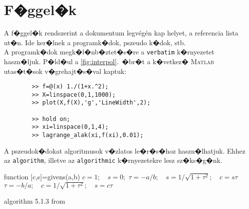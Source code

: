\documentclass[oneside,11pt,a4paper]{article}
\begin{document}
\newpage
\appendix
\thesection
\section{F�ggel�k}	
	A f�ggel�k rendszerint a dokumentum legvégén kap helyet, a referencia lista ut�n. Ide ker�lnek a programk�dok, pszeudo k�dok, stb.\\
	A programk�dok megk�l�nb�ztet�s�re a \texttt{verbatim} k�rnyezetet haszn�ljuk. P�ld�ul a \ref{fig:interpol}.~�br�t a k�vetkez� \textsc{Matlab} utas�t�sok v�grehajt�s�val kaptuk:
	\begin{verbatim}
		>> f=@(x) 1./(1+x.^2);
		>> X=linspace(0,1,1000);
		>> plot(X,f(X),'g','LineWidth',2);

		>> hold on;		
		>> xi=linspace(0,1,4);
		>> lagrange_alak(xi,f(xi),0.01);
	\end{verbatim}
	A pszeudok�dokat algoritmusok v�zlatos le�r�s�hoz haszn�lhatjuk. Ehhez az \texttt{algorithm}, illetve az \texttt{algorithmic} k�rnyezetekre lesz sz�ks�g�nk.
\begin{algorithm}[htp] 
\begin{algorithmic}
\STATE function [c,s]=givens(a,b)
        \STATE $c=1;\quad s=0;$
\ELSE
                \STATE $\tau=-a/b;\quad s=1/\sqrt{1+\tau^2};\quad c=s\tau$
        \ELSE
                \STATE $\tau=-b/a;\quad c=1/\sqrt{1+\tau^2};\quad s=c\tau$        
        \ENDIF
\ENDIF
\end{algorithmic}
\caption{algorithm 5.1.3 from \cite{matComp}}
\label{alg:givens}
\end{algorithm}
\end{document}
